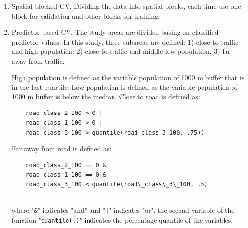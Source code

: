 \documentclass{article}
\begin{document}
\begin{enumerate}
    \item Spatial blocked CV. Dividing the data into spatial blocks, each time use one block for validation and other blocks for training. 
    
    \item Predictor-based CV. The study areas are divided basing on classified predictor values. In this study, three subareas are defined:  1) close to traffic and high population:  
    2) close to traffic and middle low population. 3) far away from traffic. 
    
    High population is defined as the variable population of 1000 m buffer that is in the last quartile. Low population is defined as the variable population of 1000 m buffer is below the median. Close to road is defined as: 
    \begin{lstlisting} 
    road_class_2_100 > 0 | 
    road_class_1_100 > 0 |
    road_class_3_100 > quantile(road_class_3_100, .75)) \end{lstlisting}
   
    Far away from road is defined as:
  \begin{lstlisting} 
    road_class_2_100 == 0 &
    road_class_1_100 == 0 & 
    road_class_3_100 < quantile(road\_class\_3\_100, .5)
    
    \end{lstlisting}
    where "{\tt \&}" indicates "and" and "{\tt |}" indicates "or". the second variable of the function "{\tt quantile(.)}" indicates the percentage quantile of the variables. 
   
\end{enumerate}

\end{document}
